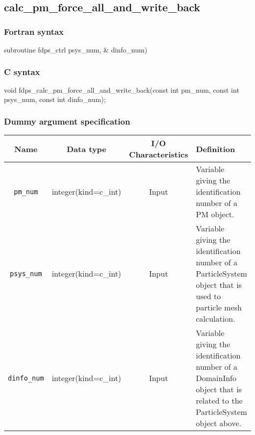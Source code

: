 \subsection{calc\_pm\_force\_all\_and\_write\_back}
\subsubsection*{Fortran syntax}
\begin{screen}
\begin{spverbatim}
subroutine fdps_ctrl%
                                                      psys_num, &
                                                      dinfo_num)
\end{spverbatim}
\end{screen}

\subsubsection*{C syntax}
\begin{screen}
\begin{spverbatim}
void fdps_calc_pm_force_all_and_write_back(const int pm_num,
                                           const int psys_num,
                                           const int dinfo_num);
\end{spverbatim}
\end{screen}


\subsubsection*{Dummy argument specification}
\begin{table}[h]
\begin{tabularx}{\linewidth}{cccX}
\toprule
\rowcolor{Snow2}
Name & Data type & I/O Characteristics & Definition \\
\midrule
\texttt{pm\_num} & integer(kind=c\_int) & Input & Variable giving the identification number of a PM object.\\
\texttt{psys\_num} & integer(kind=c\_int) & Input & Variable giving the identification number of a ParticleSystem object that is used to particle mesh calculation.\\
\texttt{dinfo\_num} & integer(kind=c\_int) & Input & Variable giving the identification number of a DomainInfo object that is related to the ParticleSystem object above.\\
\bottomrule
\end{tabularx}
\end{table}

